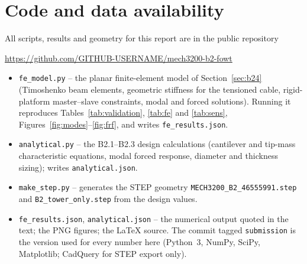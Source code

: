 \documentclass[11pt,a4paper]{article}
\begin{document}
\section*{Code and data availability}\label{sec:code}
{\small All scripts, results and geometry for this report are in the public repository
\begin{center}
\url{https://github.com/GITHUB-USERNAME/mech3200-b2-fowt}
\end{center}
\begin{itemize}[nosep]
\item \texttt{fe\_model.py} -- the planar finite-element model of Section~\ref{sec:b24} (Timoshenko beam elements, geometric stiffness for the tensioned cable, rigid-platform master--slave constraints, modal and forced solutions). Running it reproduces Tables~\ref{tab:validation}, \ref{tab:fe} and \ref{tab:sens}, Figures~\ref{fig:modes}--\ref{fig:frf}, and writes \texttt{fe\_results.json}.
\item \texttt{analytical.py} -- the B2.1--B2.3 design calculations (cantilever and tip-mass characteristic equations, modal forced response, diameter and thickness sizing); writes \texttt{analytical.json}.
\item \texttt{make\_step.py} -- generates the STEP geometry \texttt{MECH3200\_B2\_46555991.step} and \texttt{B2\_tower\_only.step} from the design values.
\item \texttt{fe\_results.json}, \texttt{analytical.json} -- the numerical output quoted in the text; the PNG figures; the \LaTeX{} source. The commit tagged \texttt{submission} is the version used for every number here (Python~3, NumPy, SciPy, Matplotlib; CadQuery for STEP export only).
\end{itemize}}
\end{document}
